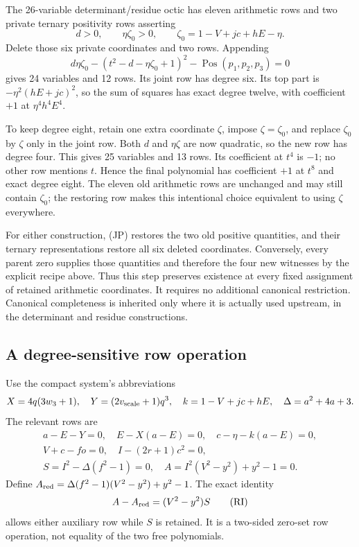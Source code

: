 The 26-variable determinant/residue octic has eleven arithmetic rows and
two private ternary positivity rows asserting
\[
 d>0,\qquad \eta\zeta_0>0,
 \qquad \zeta_0=1-V+jc+hE-\eta.
\]
Delete those six private coordinates and two rows.  Appending
\[
 d\eta\zeta_0-(t^2-d-\eta\zeta_0+1)^2
       -\operatorname{Pos}(p_1,p_2,p_3)=0             \tag{J24}
\]
gives 24 variables and 12 rows.  Its joint row has degree six.  Its top
part is $-\eta^2(hE+jc)^2$, so the sum of squares has exact degree twelve,
with coefficient $+1$ at $\eta^4h^4E^4$.

To keep degree eight, retain one extra coordinate $\zeta$, impose
$\zeta=\zeta_0$, and replace $\zeta_0$ by $\zeta$ only in the joint row.
Both $d$ and $\eta\zeta$ are now quadratic, so the new row has degree four.
This gives 25 variables and 13 rows.  Its coefficient at $t^4$ is $-1$;
no other row mentions $t$.  Hence the final polynomial has coefficient
$+1$ at $t^8$ and exact degree eight.  The eleven old arithmetic rows
are unchanged and may still contain $\zeta_0$; the restoring row makes
this intentional choice equivalent to using $\zeta$ everywhere.

For either construction, (JP) restores the two old positive quantities,
and their ternary representations restore all six deleted coordinates.
Conversely, every parent zero supplies those quantities and therefore the
four new witnesses by the explicit recipe above.  Thus this step preserves
existence at every fixed assignment of retained arithmetic coordinates.
It requires no additional canonical restriction.  Canonical completeness
is inherited only where it is actually used upstream, in the determinant
and residue constructions.

\subsection{A degree-sensitive row operation}

Use the compact system's abbreviations
\[
 X=4q(3w_3+1),\quad Y=(2v_{\rm scale}+1)q^3,
 \quad k=1-V+jc+hE,\quad\Delta=a^2+4a+3.
\]
The relevant rows are
\[
\begin{gathered}
 a-E-Y=0,\quad E-X(a-E)=0,\quad c-\eta-k(a-E)=0,\\
 V+c-fo=0,\quad I-(2r+1)c^2=0,\\
 S=I^2-\Delta(f^2-1)=0,\quad
 A=I^2(V^2-y^2)+y^2-1=0.
\end{gathered}
\]
Define $A_{\rm red}=\Delta(f^2-1)(V^2-y^2)+y^2-1$.  The exact identity
\[
       A-A_{\rm red}=(V^2-y^2)S                 \tag{RI}
\]
allows either auxiliary row while $S$ is retained.  It is a two-sided
zero-set row operation, not equality of the two free polynomials.

